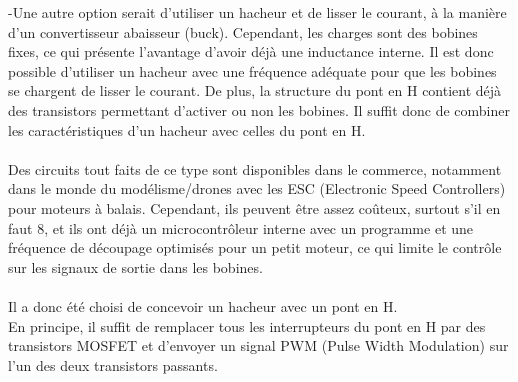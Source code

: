 \documentclass{article}
\begin{document}
-Une autre option serait d'utiliser un hacheur et de lisser le courant, à la manière d'un convertisseur abaisseur (buck). Cependant, les charges sont des bobines fixes, ce qui présente l'avantage d'avoir déjà une inductance interne. Il est donc possible d'utiliser un hacheur avec une fréquence adéquate pour que les bobines se chargent de lisser le courant.
De plus, la structure du pont en H contient déjà des transistors permettant d'activer ou non les bobines. Il suffit donc de combiner les caractéristiques d'un hacheur avec celles du pont en H.
\\\\
Des circuits tout faits de ce type sont disponibles dans le commerce, notamment dans le monde du modélisme/drones avec les ESC (Electronic Speed Controllers) pour moteurs à balais. Cependant, ils peuvent être assez coûteux, surtout s'il en faut 8, et ils ont déjà un microcontrôleur interne avec un programme et une fréquence de découpage optimisés pour un petit moteur, ce qui limite le contrôle sur les signaux de sortie dans les bobines.
\\\\
Il a donc été choisi de concevoir un hacheur avec un pont en H.
\\
En principe, il suffit de remplacer tous les interrupteurs du pont en H par des transistors MOSFET et d'envoyer un signal PWM (Pulse Width Modulation) sur l'un des deux transistors passants.
\end{document}
